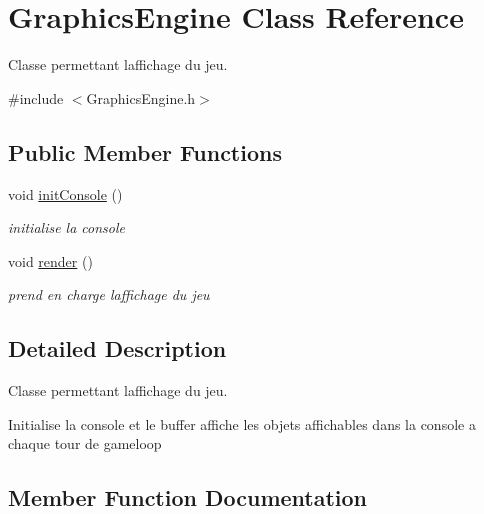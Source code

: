 \hypertarget{class_graphics_engine}{}\section{Graphics\+Engine Class Reference}
\label{class_graphics_engine}


Classe permettant l\textquotesingle{}affichage du jeu.  




{\ttfamily \#include $<$Graphics\+Engine.\+h$>$}

\subsection*{Public Member Functions}
\begin{DoxyCompactItemize}
\item 
\hypertarget{class_graphics_engine_a854823b6346b54852e1c3bfdc20cf8c9}{}\label{class_graphics_engine_a854823b6346b54852e1c3bfdc20cf8c9} 
void \hyperlink{class_graphics_engine_a854823b6346b54852e1c3bfdc20cf8c9}{init\+Console} ()
\begin{DoxyCompactList}\small\item\em initialise la console \end{DoxyCompactList}\item 
void \hyperlink{class_graphics_engine_adef77faf4662503f4b6d2036ac9184fa}{render} ()
\begin{DoxyCompactList}\small\item\em prend en charge l\textquotesingle{}affichage du jeu \end{DoxyCompactList}\end{DoxyCompactItemize}


\subsection{Detailed Description}
Classe permettant l\textquotesingle{}affichage du jeu. 

Initialise la console et le buffer affiche les objets affichables dans la console a chaque tour de gameloop 

\subsection{Member Function Documentation}
\hypertarget{class_graphics_engine_adef77faf4662503f4b6d2036ac9184fa}{}\label{class_graphics_engine_adef77faf4662503f4b6d2036ac9184fa} 
